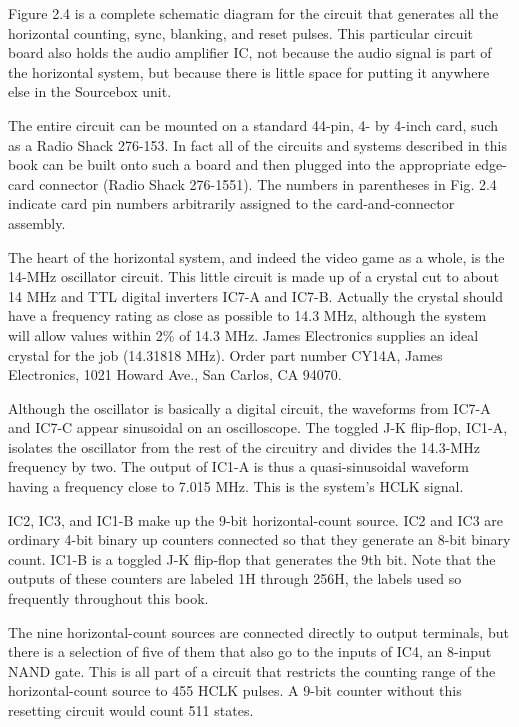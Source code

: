 \documentclass[11pt]{book}              %
\begin{document}
Figure 2.4 is a complete schematic diagram for the circuit that generates all the horizontal counting, sync, blanking, and reset pulses. This particular circuit board also holds the audio amplifier IC, not because the audio signal is part of the horizontal system, but because there is little space for putting it anywhere else in the Sourcebox unit.

The entire circuit can be mounted on a standard 44-pin, 4- by 4-inch card, such as a Radio Shack 276-153. In fact all of the circuits and systems described in this book can be built onto such a board and then plugged into the appropriate edge-card connector (Radio Shack 276-1551). The numbers in parentheses in Fig. 2.4 indicate card pin numbers arbitrarily assigned to the card-and-connector assembly.

The heart of the horizontal system, and indeed the video game as a whole, is the 14-MHz oscillator circuit. This little circuit is made up of a crystal cut to about 14 MHz and TTL digital inverters IC7-A and IC7-B. Actually the crystal should have a frequency rating as close as possible to 14.3 MHz, although the system will allow values within 2\% of 14.3 MHz. James Electronics supplies an ideal crystal for the job (14.31818 MHz). Order part number CY14A, James Electronics, 1021 Howard Ave., San Carlos, CA 94070.

Although the oscillator is basically a digital circuit, the waveforms from IC7-A and IC7-C appear sinusoidal on an oscilloscope. The toggled J-K flip-flop, IC1-A, isolates the oscillator from the rest of the circuitry and divides the 14.3-MHz frequency by two. The output of IC1-A is thus a quasi-sinusoidal waveform having a frequency close to 7.015 MHz. This is the system's HCLK signal.

IC2, IC3, and IC1-B make up the 9-bit horizontal-count source. IC2 and IC3 are ordinary 4-bit binary up counters connected so that they generate an 8-bit binary count. IC1-B is a toggled J-K flip-flop that generates the 9th bit. Note that the outputs of these counters are labeled 1H through 256H, the labels used so frequently throughout this book.

The nine horizontal-count sources are connected directly to output terminals, but there is a selection of five of them that also go to the inputs of IC4, an 8-input NAND gate. This is all part of a circuit that restricts the counting range of the horizontal-count source to 455 HCLK pulses. A 9-bit counter without this resetting circuit would count 511 states.
\end{document}
